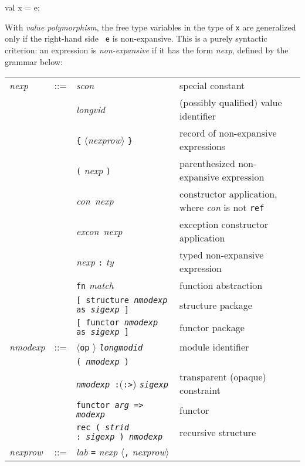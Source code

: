 \documentclass[fleqn,a4paper]{article}
\begin{document}
\begin{program}
val x = e;
\end{program}

\noindent With {\em value polymorphism\/}, the free type variables in
the type of {\tt x} are generalized only if the right-hand side {\tt
  e} is non-expansive.  This is a purely syntactic criterion: an
expression is {\em non-expansive\/} if it has the form {\it nexp\/},
defined by the grammar below:

\begin{quot} 
\begin{tabular}{@{}lcll}
{\it nexp} & ::= & {\it scon\/}  & special constant\\
&& {\it longvid\/} & (possibly qualified) value identifier\\           
&& \verb#{# $\langle${\it nexprow\/}$\rangle$ \verb#}# & record of
non-expansive expressions\\
&& \verb#(# {\it nexp\/} \verb#)# & parenthesized non-expansive expression\\
&& {\it con\/}\ {\it nexp\/} & constructor application, where {\it con\/}
is not {\tt ref}\\
&& {\it excon\/}\ {\it nexp\/} & exception constructor application\\
&& {\it nexp} \verb#:# {\it ty\/} & typed non-expansive expression\\
&& \verb#fn# {\it match} & function abstraction\\
& & {\tt [ structure {\it nmodexp\/} as {\it sigexp\/} ]} & structure package \\
& & {\tt [ functor {\it nmodexp\/} as {\it sigexp\/} ]} & functor package \\[2ex]
{\it nmodexp\/} & ::=  & $\langle${\tt op} $\rangle$ {\tt {\it longmodid\/}}& module identifier\\
& & {\tt ( {\it nmodexp\/} )} & \\
& & {\tt {\it nmodexp\/} :}({\tt :>}) {\tt {\it sigexp\/}} & transparent (opaque) constraint \\
& & {\tt functor {\it  arg} => {\it modexp}}  & functor  \\
& & {\tt rec ( {\it strid\/} :\ {\it sigexp} ) {\it nmodexp}}  & recursive structure \\[2ex]
{\it nexprow} & ::= & {\it lab\/} \verb#=# {\it nexp\/}
$\langle$\verb#,# {\it nexprow\/}$\rangle$  \\
\end{tabular}
\end{quot}
\end{document}

